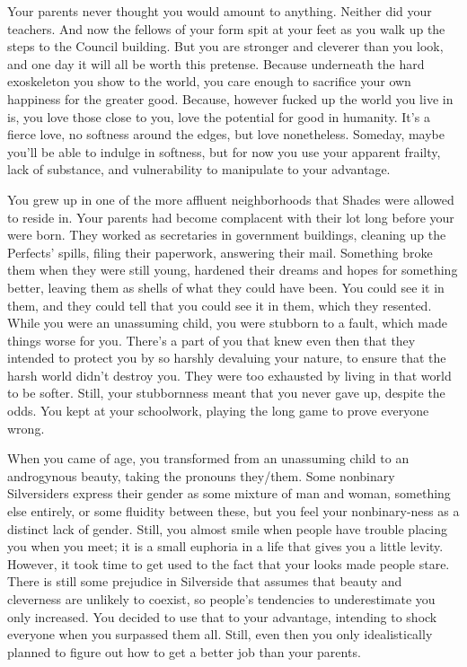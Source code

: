 \documentclass[char]{Silversiders}
\begin{document}
\name{\cLove{}}

Your parents never thought you would amount to anything. Neither did your teachers. And now the fellows of your form spit at your feet as you walk up the steps to the Council building. But you are stronger and cleverer than you look, and one day it will all be worth this pretense. Because underneath the hard exoskeleton you show to the world, you care enough to sacrifice your own happiness for the greater good. Because, however fucked up the world you live in is, you love those close to you, love the potential for good in humanity. It's a fierce love, no softness around the edges, but love nonetheless. Someday, maybe you'll be able to indulge in softness, but for now you use your apparent frailty, lack of substance, and vulnerability to manipulate to your advantage.

You grew up in one of the more affluent neighborhoods that Shades were allowed to reside in. Your parents had become complacent with their lot long before your were born. They worked as secretaries in government buildings, cleaning up the Perfects' spills, filing their paperwork, answering their mail. Something broke them when they were still young, hardened their dreams and hopes for something better, leaving them as shells of what they could have been. You could see it in them, and they could tell that you could see it in them, which they resented. While you were an unassuming child, you were stubborn to a fault, which made things worse for you. There's a part of you that knew even then that they intended to protect you by so harshly devaluing your nature, to ensure that the harsh world didn't destroy you. They were too exhausted by living in that world to be softer. Still, your stubbornness meant that you never gave up, despite the odds. You kept at your schoolwork, playing the long game to prove everyone wrong.

When you came of age, you transformed from an unassuming child to an androgynous beauty, taking the pronouns they/them. Some nonbinary Silversiders express their gender as some mixture of man and woman, something else entirely, or some fluidity between these, but you feel your nonbinary-ness as a distinct lack of gender. Still, you almost smile when people have trouble placing you when you meet; it is a small euphoria in a life that gives you a little levity. However, it took time to get used to the fact that your looks made people stare. There is still some prejudice in Silverside that assumes that beauty and cleverness are unlikely to coexist, so people's tendencies to underestimate you only increased. You decided to use that to your advantage, intending to shock everyone when you surpassed them all. Still, even then you only idealistically planned to figure out how to get a better job than your parents.
\end{document}
